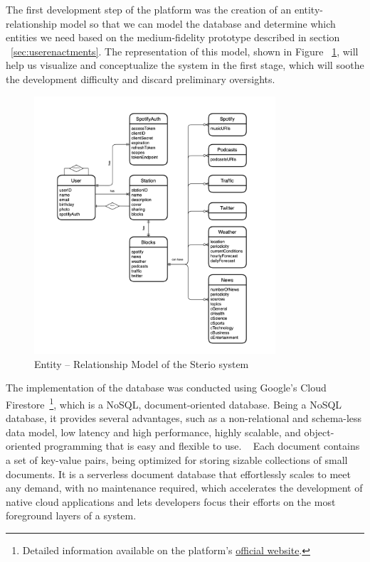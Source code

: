 The first development step of the platform was the creation of an entity-relationship model so that we can model the database and determine which entities we need based on the medium-fidelity prototype described in section ~\ref{sec:userenactments}. The representation of this model, shown in Figure ~\ref{fig:eadiagram}, will help us visualize and conceptualize the system in the first stage, which will soothe the development difficulty and discard preliminary oversights.

\begin{figure}[h]
\centering
\includegraphics[width=0.8\textwidth]{./Images/ea.png}
\caption{Entity – Relationship Model of the Sterio system}
\label{fig:eadiagram}
\end{figure}


The implementation of the database was conducted using Google's Cloud Firestore~\footnote{Detailed information available on the platform's \href{https://firebase.google.com/products/firestore}{official website}.}, which is a NoSQL, document-oriented database. Being a NoSQL database, it provides several advantages, such as a non-relational and schema-less data model, low latency and high performance, highly scalable, and object-oriented programming that is easy and flexible to use. ~\cite{Stonebraker2010} Each document contains a set of key-value pairs, being optimized for storing sizable collections of small documents. It is a serverless document database that effortlessly scales to meet any demand, with no maintenance required, which accelerates the development of native cloud applications and lets developers focus their efforts on the most foreground layers of a system.

